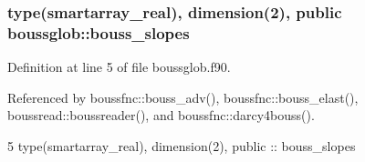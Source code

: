 \subsubsection[{bouss\+\_\+slopes}]{\setlength{\rightskip}{0pt plus 5cm}type({\bf smartarray\+\_\+real}), dimension(2), public boussglob\+::bouss\+\_\+slopes}\label{namespaceboussglob_a7d82925866b8a3f55db46859dc95922b}


Definition at line 5 of file boussglob.\+f90.



Referenced by boussfnc\+::bouss\+\_\+adv(), boussfnc\+::bouss\+\_\+elast(), boussread\+::boussreader(), and boussfnc\+::darcy4bouss().


\begin{DoxyCode}
5   \textcolor{keywordtype}{type}(smartarray_real), \textcolor{keywordtype}{dimension(2)}, \textcolor{keywordtype}{public} :: bouss_slopes
\end{DoxyCode}
